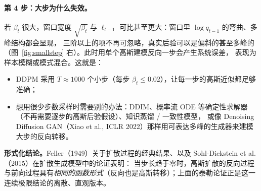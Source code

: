 \documentclass[a4paper,fontset=none,zihao=5]{ctexart}
\numberwithin{equation}{section}
\begin{document}
\paragraph{第 4 步：大步为什么失效。}若 $\beta_t$ 很大，窗口宽度 $\sqrt{\beta_t}$ 与 $\ell_{t-1}$ 可比甚至更大：窗口里 $\log q_{t-1}$ 的弯曲、多峰结构都会显现，
三阶以上的项不再可忽略，真实后验可以是偏斜的甚至多峰的（图~\ref{fig:smallstep} 右）。此时用单个高斯建模反向一步会产生系统误差，
表现为样本模糊或模式混合。这就是：
\begin{itemize}[leftmargin=1.6em,itemsep=1pt]
  \item DDPM 采用 $T\approx1000$ 个小步（每步 $\beta_t\le0.02$），让每一步的高斯近似都足够准确；
  \item 想用很少步数采样时需要别的办法：DDIM、概率流 ODE 等确定性求解器（不再需要逐步的高斯后验假设）、知识蒸馏 / 一致性模型，
        或像 Denoising Diffusion GAN（Xiao et al., ICLR 2022）那样用可表达多峰的生成器来建模大步的反向转移。
\end{itemize}
\textbf{形式化结论。}Feller（1949）关于扩散过程的经典结果、以及 Sohl-Dickstein et al.（2015）在扩散生成模型中的论证表明：
当步长趋于零时，高斯扩散的反向过程与前向过程具有\emph{相同的函数形式}（反向也是高斯转移）；上面的泰勒论证正是这一连续极限结论的离散、直观版本。
\end{document}
